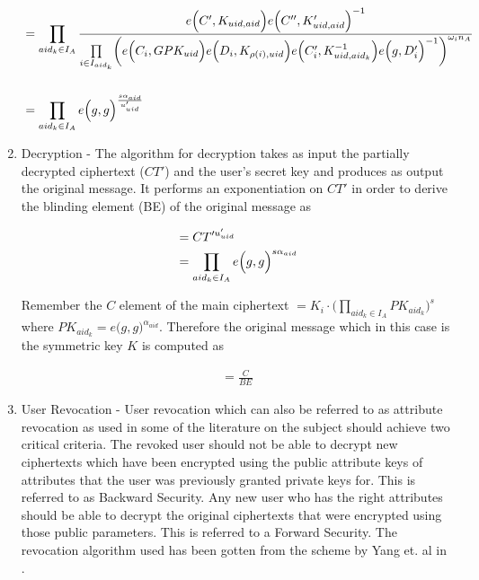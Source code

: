\begin{enumerate}
	\begin{align*}
	&= \prod\limits_{aid_{k} \in I_{A}} \frac{e\Bigl(C', K_{uid,aid}\Bigl)e\Bigl(C'', K'_{uid,aid}\Bigl)^{-1}}{\prod\limits_{i \in I_{aid_k}}\biggl(e\Bigl(C_i, GPK_{uid}\Bigl)e\Bigl(D_i, K_{\rho(i),uid}\Bigl)e\Bigl(C'_i, K_{uid,aid_k}^{-1}\Bigl)e\Bigl(g, D'_i\Bigl)^{-1}\biggl)^{\omega_{i}n_A}} \\ \\
	&= \prod\limits_{aid_{k} \in I_{A}} e\Bigl(g, g\Bigl)^{\frac{s\alpha_{aid}}{u'_{uid}}}
	\end{align*}
	
	
	
	
	
	\item Decryption - The algorithm for decryption takes as input the partially decrypted ciphertext ($CT'$) and the user's secret key and produces as output the original message. It performs an exponentiation on $CT'$ in order to derive the blinding element (BE) of the original message as
	
	\begin{align*}
	&= CT'^{u'_{uid}} \\ &= \prod\limits_{aid_{k} \in I_{A}} e\Bigl(g, g\Bigl)^{s\alpha_{aid}}
	\end{align*}
	
	Remember the $C$ element of the main ciphertext $= K_i\cdot\bigl(\prod\limits_{aid_{k} \in I_{A}}PK_{aid_{k}}\bigl)^{s}$ where $PK_{aid_{k}} = e\bigl(g, g\bigl)^{\alpha_{aid}}$. Therefore the original message which in this case is the symmetric key $K$ is computed as
	
	\begin{align*}
	= \frac{C}{BE}
	\end{align*}
	
	\item User Revocation - User revocation which can also be referred to as attribute revocation as used in some of the literature on the subject should achieve two critical criteria. The revoked user should not be able to decrypt new ciphertexts which have been encrypted using the public attribute keys of attributes that the user was previously granted private keys for. This is referred to as Backward Security. Any new user who has the right attributes should be able to decrypt the original ciphertexts that were encrypted using those public parameters. This is referred to a Forward Security. The revocation algorithm used has been gotten from the scheme by Yang et. al in \cite{Yang2014}.
	

\end{enumerate}
